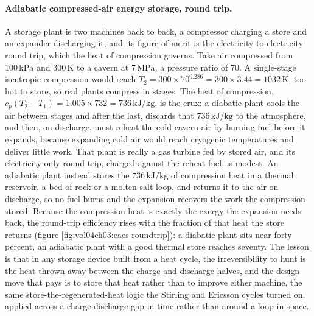 \paragraph{Adiabatic compressed-air energy storage, round trip.} A storage plant
is two machines back to back, a compressor charging a store and an expander
discharging it, and its figure of merit is the electricity-to-electricity round
trip, which the heat of compression governs. Take air compressed from
$100\,\text{kPa}$ and $300\,\si{\kelvin}$ to a cavern at $7\,\text{MPa}$, a
pressure ratio of $70$. A single-stage isentropic compression would reach
$T_2 = 300 \times 70^{0.286} = 300 \times 3.44 = 1032\,\si{\kelvin}$, too hot to
store, so real plants compress in stages. The heat of compression, $c_p(T_2 - T_1)
= 1.005 \times 732 = 736\,\text{kJ}/\text{kg}$, is the crux: a diabatic plant cools
the air between stages and after the last, discards that $736\,\text{kJ}/\text{kg}$
to the atmosphere, and then, on discharge, must reheat the cold cavern air by
burning fuel before it expands, because expanding cold air would reach cryogenic
temperatures and deliver little work. That plant is really a gas turbine fed by
stored air, and its electricity-only round trip, charged against the reheat fuel,
is modest. An adiabatic plant instead stores the $736\,\text{kJ}/\text{kg}$ of
compression heat in a thermal reservoir, a bed of rock or a molten-salt loop, and
returns it to the air on discharge, so no fuel burns and the expansion recovers the
work the compression stored. Because the compression heat is exactly the exergy the
expansion needs back, the round-trip efficiency rises with the fraction of that heat
the store returns (figure \ref{fig:vol04ch03:caes-roundtrip}): a diabatic plant
sits near forty percent, an adiabatic plant with a good thermal store reaches
seventy. The lesson is that in any storage device built from a heat cycle, the
irreversibility to hunt is the heat thrown away between the charge and discharge
halves, and the design move that pays is to store that heat rather than to improve
either machine, the same store-the-regenerated-heat logic the Stirling and Ericsson
cycles turned on, applied across a charge-discharge gap in time rather than around
a loop in space.



